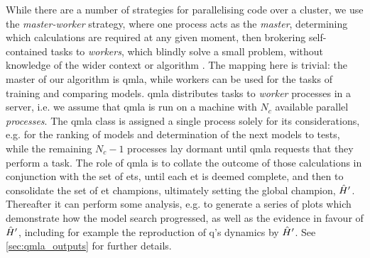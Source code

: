 While there are a number of strategies for parallelising code over a cluster, 
    we use the \emph{master-worker} strategy, where one process acts as the \emph{master}, 
    determining which calculations are required at any given moment, 
    then brokering self-contained tasks to \emph{workers}, 
    which blindly solve a small problem, without knowledge of the wider context or algorithm \cite{hockney2019parallel}.
The mapping here is trivial: the master of our algorithm is \gls{qmla}, 
    while workers can be used for the tasks of training and comparing models. 
\gls{qmla} distributes tasks to \emph{worker} processes in a server, 
    i.e. we assume that \gls{qmla} is run on a machine with $N_c$ available parallel \emph{processes}\footnotemark. 
The \gls{qmla} class is assigned a single process solely for its considerations, 
    e.g. for the ranking of models and determination of the next models to tests, 
    while the remaining $N_c - 1$ processes lay dormant until \gls{qmla} requests that they perform a task. 
The role of \gls{qmla} is to collate the outcome of those calculations in conjunction with the set of \glspl{et}, 
    until each \gls{et} is deemed complete, and then to consolidate the set of 
    \gls{et} champions, ultimately setting the global champion, $\hat{H}^{\prime}$. 
Thereafter it can perform some analysis, e.g. to generate a series of plots which demonstrate how the 
    model search progressed, as well as the evidence in favour of $\hat{H}^{\prime}$, including for example 
    the reproduction of \gls{q}'s dynamics by $\hat{H}^{\prime}$. 
See \cref{sec:qmla_outputs} for further details. 

